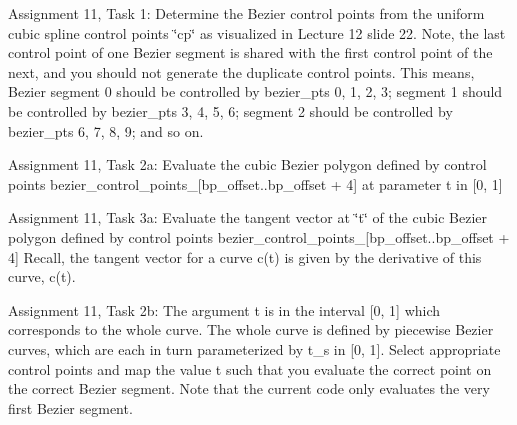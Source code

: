 
\begin{DoxyRefList}
\item[\label{todo__todo000003}%
\hypertarget{todo__todo000003}{}%
Member \hyperlink{classPiecewiseBezier_a7c05af0ba43e9c2459fbb502b078676d}{Piecewise\+Bezier\+:\+:control\+\_\+polygon\+\_\+to\+\_\+bezier\+\_\+points} (std\+::vector$<$ vec3 $>$ const \&control\+\_\+polygon)]Assignment 11, Task 1\+: Determine the Bezier control points from the uniform cubic spline control points \char`\"{}cp\char`\"{} as visualized in Lecture 12 slide 22. Note, the last control point of one Bezier segment is shared with the first control point of the next, and you should not generate the duplicate control points. This means, Bezier segment 0 should be controlled by bezier\+\_\+pts 0, 1, 2, 3; segment 1 should be controlled by bezier\+\_\+pts 3, 4, 5, 6; segment 2 should be controlled by bezier\+\_\+pts 6, 7, 8, 9; and so on.  
\item[\label{todo__todo000001}%
\hypertarget{todo__todo000001}{}%
Member \hyperlink{classPiecewiseBezier_ab8ef08d6d3c8f34e71a04cf130841913}{Piecewise\+Bezier\+:\+:eval\+\_\+bezier} (int bp\+\_\+offset, float t) const ]Assignment 11, Task 2a\+: Evaluate the cubic Bezier polygon defined by control points bezier\+\_\+control\+\_\+points\+\_\+\mbox{[}bp\+\_\+offset..bp\+\_\+offset + 4\mbox{]} at parameter t in \mbox{[}0, 1\mbox{]}  
\item[\label{todo__todo000002}%
\hypertarget{todo__todo000002}{}%
Member \hyperlink{classPiecewiseBezier_ad438e5d185f6e74f85ff84e0dd7d73cd}{Piecewise\+Bezier\+:\+:eval\+\_\+bezier\+\_\+tangent} (int bp\+\_\+offset, float t) const ]Assignment 11, Task 3a\+: Evaluate the tangent vector at \char`\"{}t\char`\"{} of the cubic Bezier polygon defined by control points bezier\+\_\+control\+\_\+points\+\_\+\mbox{[}bp\+\_\+offset..bp\+\_\+offset + 4\mbox{]} Recall, the tangent vector for a curve c(t) is given by the derivative of this curve, c\textquotesingle{}(t).  
\item[\label{todo__todo000004}%
\hypertarget{todo__todo000004}{}%
Member \hyperlink{classPiecewiseBezier_aa3f433f0483cfd5b9b937e4eaee9e52e}{Piecewise\+Bezier\+:\+:eval\+\_\+piecewise\+\_\+bezier\+\_\+curve} (float t) const ]Assignment 11, Task 2b\+: The argument t is in the interval \mbox{[}0, 1\mbox{]} which corresponds to the whole curve. The whole curve is defined by piecewise Bezier curves, which are each in turn parameterized by t\+\_\+s in \mbox{[}0, 1\mbox{]}. Select appropriate control points and map the value t such that you evaluate the correct point on the correct Bezier segment. Note that the current code only evaluates the very first Bezier segment.  

\end{DoxyRefList}
